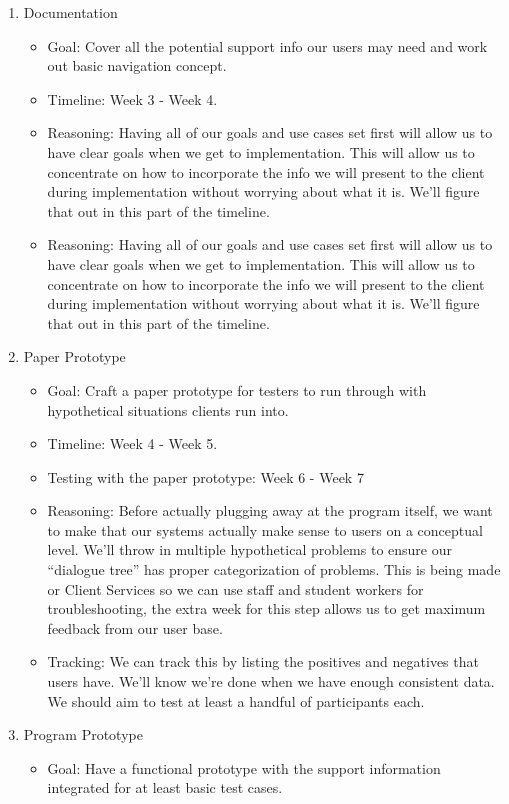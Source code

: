 \documentclass[12pt, letterpaper]{article}
\begin{document}
	\begin{enumerate}
		\item Documentation 
		\begin{itemize}
			\item Goal: Cover all the potential support info our users may need and work out basic navigation concept.
			\item Timeline: Week 3 - Week 4.
			\item Reasoning: Having all of our goals and use cases set first will allow us to have clear goals when we get to implementation. This will allow us to concentrate on how to incorporate the info we will present to the client during implementation without worrying about what it is. We’ll figure that out in this part of the timeline. 
			\item Reasoning: Having all of our goals and use cases set first will allow us to have clear goals when we get to implementation. This will allow us to concentrate on how to incorporate the info we will present to the client during implementation without worrying about what it is. We’ll figure that out in this part of the timeline. 
		\end{itemize}
		\item Paper Prototype
		\begin{itemize}
			\item Goal: Craft a paper prototype for testers to run through with hypothetical situations clients run into.
			\item Timeline: Week 4 - Week 5.
			\item Testing with the paper prototype: Week 6 - Week 7
			\item Reasoning: Before actually plugging away at the program itself, we want to make that our systems actually make sense to users on a conceptual level. We’ll throw in multiple hypothetical problems to ensure our “dialogue tree” has proper categorization of problems. This is being made or Client Services so we can use staff and student workers for troubleshooting, the extra week for this step allows us to get maximum feedback from our user base. 
			\item Tracking: We can track this by listing the positives and negatives that users have. We’ll know we’re done when we have enough consistent data. We should aim to test at least a handful of participants each. 
		\end{itemize}
	\item Program Prototype
	\begin{itemize}
		\item Goal: Have a functional prototype with the support information integrated for at least basic test cases. 

\end{itemize}
\end{enumerate}
\end{document}
